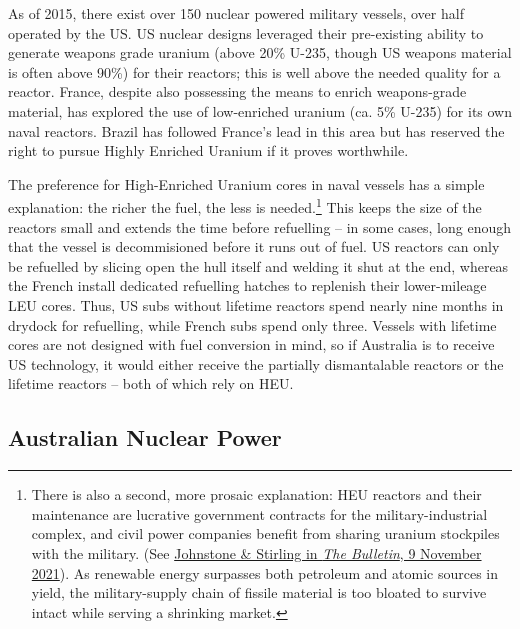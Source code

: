 \documentclass[letterpaper,12pt,twoside]{article} %
\begin{document}
\begin{multicols}{2}
As of 2015, there exist over 150 nuclear powered military vessels, over half operated by the US.\autocite[3]{hippel2016banning} US nuclear designs leveraged their pre-existing ability to generate weapons grade uranium (above 20\% U-235, though US weapons material is often above 90\%) for their reactors; this is well above the needed quality for a reactor. France, despite also possessing the means to enrich weapons-grade material, has explored the use of low-enriched uranium (ca. 5\% U-235) for its own naval reactors. Brazil has followed France's lead in this area but has reserved the right to pursue Highly Enriched Uranium if it proves worthwhile.

The preference for High-Enriched Uranium cores in naval vessels has a simple explanation: the richer the fuel, the less is needed.\footnote{There is also a second, more prosaic explanation: HEU reactors and their maintenance are lucrative government contracts for the military-industrial complex, and civil power companies benefit from sharing uranium stockpiles with the military. (See \href{https://thebulletin.org/2021/11/australian-uk-us-nuclear-submarine-deal-exposes-civilian-military-links/}{Johnstone \& Stirling in \textit{The Bulletin}, 9 November 2021}). As renewable energy surpasses both petroleum and atomic sources in yield, the military-supply chain of fissile material is too bloated to survive intact while serving a shrinking market. \nocite{bulletin2021civil}} This keeps the size of the reactors small and extends the time before refuelling -- in some cases, long enough that the vessel is decommisioned before it runs out of fuel. US reactors can only be refuelled by slicing open the hull itself and welding it shut at the end, whereas the French install dedicated refuelling hatches to replenish their lower-mileage LEU cores. Thus, US subs without lifetime reactors spend nearly nine months in drydock for refuelling, while French subs spend only three.\autocite[24]{hippel2016banning} Vessels with lifetime cores are not designed with fuel conversion in mind, so if Australia is to receive US technology, it would either receive the partially dismantalable reactors or the lifetime reactors -- both of which rely on HEU.

\subsection*{Australian Nuclear Power}


\end{multicols}
\end{document}
